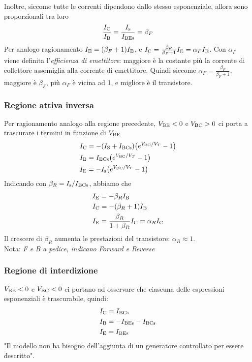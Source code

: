 \documentclass[../elettronica]{subfiles}
\begin{document}
Inoltre, siccome tutte le correnti dipendono dallo stesso esponenziale, allora sono proporzionali tra loro
\[
    \frac{\I{C}}{\I{B}} = \frac{\I{s}}{\I{BEs}} = \beta_F
\]
Per analogo ragionamento $\I{E} = (\beta_F+1) \I{B}$, e $\I{C} = \frac{\beta_F}{\beta_F + 1}\I{E} = \alpha_F \I{E}$.
Con $\alpha_F$ viene definita l'\textit{efficienza di emettitore}: maggiore è la costante più la corrente di collettore assomiglia alla corrente di emettitore.
Quindi siccome $\alpha_F = \frac{\beta_F}{\beta_F + 1}$, maggiore è $\beta_F$, più $\alpha_F$ è vicina ad 1, e migliore è il transistore.

\subsubsection{Regione attiva inversa}
Per ragionamento analogo alla regione precedente, $\V{BE} < 0$ e $\V{BC} > 0$ ci porta a trascurare i termini in funzione di $\V{BE}$
\begin{align*}
    &\I{C} = -\diodecurrent[(\I{S} + \I{BCs})]{\V{BC}}\\
    &\I{B} = \diodecurrent[\I{BCs}]{\V{BC}}\\
    &\I{E} = -\diodecurrent[\I{s}]{\V{BC}}\\
\end{align*}
Indicando con $\beta_R = {\I{s}}/{\I{BCs}}$, abbiamo che
\begin{align*}
    &\I{E} = - \beta_R \I{B}\\
    &\I{C} = -(\beta_R + 1) \I{B}\\
    &\I{E} = \frac{\beta_R}{1 + \beta_R}\I{C} = \alpha_R \I{C}
\end{align*}
Il crescere di $\beta_R$ aumenta le prestazioni del transistore: $\alpha_R \approx 1$.
\\[1em]
Nota: \textit{F e B a pedice, indicano Forward e Reverse}

\subsubsection{Regione di interdizione}
$\V{BE} < 0$ e $\V{BC} < 0$ ci portano ad osservare che ciascuna delle espressioni esponenziali è trascurabile, quindi:
\begin{align*}
    &\I{C} = \I{BCs}\\
    &\I{B} = - \I{BEs} - \I{BCs}\\
    &\I{E} = \I{BEs}
\end{align*}
"Il modello non ha bisogno dell'aggiunta di un generatore controllato per essere descritto".
\end{document}
